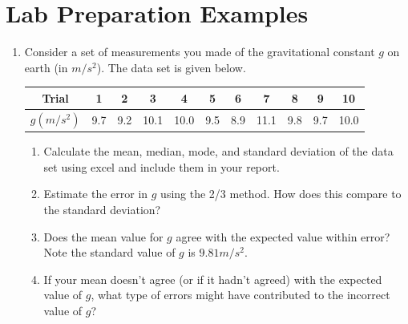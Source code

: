 \section{Lab Preparation Examples}

\begin{enumerate}
  \item Consider a set of measurements you made of the gravitational constant $g$ on earth (in $m/s^2$). The data set is given below.
  \begin{center}
    \begin{tabular}{| c | c | c | c | c | c | c | c | c | c | c |}
      \hline
      Trial &1&2&3&4&5&6&7&8&9&10 \\ \hline
      $g (m/s^2)$&9.7&9.2&10.1&10.0&9.5&8.9&11.1&9.8&9.7&10.0 \\
      \hline
    \end{tabular}
  \end{center}
  \begin{enumerate}
    \item Calculate the mean, median, mode, and standard deviation of the data set using excel and include them in your report.
    \item Estimate the error in $g$ using the 2/3 method. How does this compare to the standard deviation?
    \item Does the mean value for $g$ agree with the expected value within error? Note the standard value of $g$  is $9.81 m/s^2$.
    \item If your mean doesn't agree (or if it hadn't agreed) with the expected value of $g$, what type of errors might have contributed to the incorrect value of $g$?
  \end{enumerate}


\end{enumerate}
